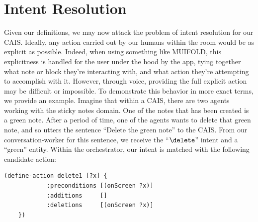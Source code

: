 \section{Intent Resolution}

Given our definitions, we may now attack the problem of intent resolution for our CAIS.
Ideally, any action carried out by our humans within the room would be as explicit
as possible. Indeed, when using something like MUIFOLD, this explicitness is handled for
the user under the hood by the app, tying together what note or block they're interacting
with, and what action they're attempting to accomplish with it. However, through voice,
providing the full explicit action may be difficult or impossible. To demonstrate this
behavior in more exact terms, we provide an example. Imagine that within a CAIS, there
are two agents working with the sticky notes domain. One of the notes that has been
created is a green note. After a period of time, one of the agents wants to delete that
green note, and so utters the sentence ``Delete the green note'' to the CAIS. From our
conversation-worker for this sentence, we receive the ``$\delete$'' intent and a ``green''
entity. Within the orchestrator, our intent is matched with the following candidate action:

\begin{lstlisting}[caption=delete action for the note,label={lst:strips}]
    (define-action delete1 [?x] {
            :preconditions [(onScreen ?x)]
            :additions     []
            :deletions     [(onScreen ?x)]
    })
\end{lstlisting}

